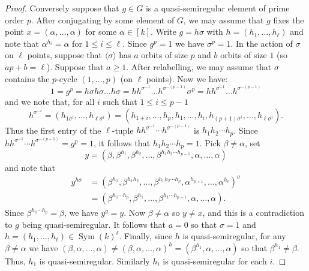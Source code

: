 \documentclass[10pt,a4paper]{amsart}
\DeclareMathOperator{\Sym}{Sym}
\newcommand{\qsre}{quasi-semiregular element}
\newcommand{\qsr}{quasi-semiregular}
\begin{document}
\begin{proof}
    Conversely suppose that $g\in G$ is a {\qsre} of prime order $p$. After conjugating by some element of $G$, we may assume that     $g$ fixes the point $x=(\alpha,\ldots,\alpha)$ for some $\alpha \in [k]$. Write $g=h\sigma$ with $h=(h_1,\ldots,h_\ell) $ and note that $\alpha^{h_i} = \alpha$ for $1\leqslant i \leqslant\ell$. Since $g^p=1$ we have $\sigma^p=1$. In the action of $\sigma$ on $\ell$ points, suppose that $\langle \sigma\rangle$ has $a$ orbits of size $p$ and $b$ orbits of size $1$ (so $ap+b=\ell$). 
    Suppose that $a\geqslant 1$. After relabelling, we may assume  that $\sigma$ contains the $p$-cycle $(1,\ldots,p)$ (on $\ell$ points). 
Now we have:  
\[
1=g^p=h\sigma h \sigma \ldots h\sigma =h h^{\sigma^{-1}} \ldots h^{\sigma^{-(p-1)}}   \sigma^p = h h^{\sigma^{-1}} \ldots h^{\sigma^{-(p-1)}} 
\]
and we note that, for all $i$ such that $1\leqslant i\leqslant p-1$
$$
h^{\sigma^{-i}}=(h_{1 \sigma^i},\ldots,h_{\ell\sigma^{i}})=(h_{1+i},\ldots,h_p,h_1,\ldots,h_i,h_{(p+1)\sigma^i},\ldots,h_{\ell \sigma^i}).
$$
Thus the first entry of the $\ell$-tuple $h h^{\sigma^{-1}} \cdots h^{\sigma^{-(p-1)}}$ is $h_1h_2\cdots h_p$. Since $h h^{\sigma^{-1}} \cdots h^{\sigma^{-(p-1)}} = g^p = 1$, it follows that $h_1h_2\cdots h_p=1$.
Pick  $\beta \neq \alpha$,  set 
    \[y= (\beta,\beta^{h_1},\beta^{h_2},\ldots,\beta^{h_1h_2\cdots h_{p-1}},\alpha,\ldots,\alpha)\]
    and note that  
\begin{align*}
       y^{h\sigma} &= (\beta^{h_1},\beta^{h_1h_2},\ldots,\beta^{h_1 h_2 \cdots h_p},\alpha^{h_{p+1}},\ldots,\alpha^{h_\ell})^\sigma \\
       & = (\beta^{h_1\cdots h_p},\beta^{h_1},\ldots,\beta^{h_1 \cdots h_{p-1}},\alpha,\ldots,\alpha).
\end{align*}
Since $\beta^{h_1\cdots h_p}=\beta$, we have $y^g = y$. Now $\beta \neq \alpha$ so $y\neq x$, and this is a contradiction to $g $ being {\qsr}. It follows that $a=0$ so that $\sigma =1$ and $h=(h_1,\ldots,h_\ell) \in \Sym(k)^\ell$. 
Finally, since $h$ is {\qsr}, for any $\beta \neq \alpha$ we have $(\beta,\alpha,\ldots,\alpha)\neq (\beta,\alpha,\ldots,\alpha)^h = (\beta^{h_1},\alpha,\ldots,\alpha) $ so that $\beta^{h_1}\neq  \beta$. Thus, $h_1$ is {\qsr}. Similarly $h_i$ is {\qsr} for each $i$.
\end{proof}
\end{document}
